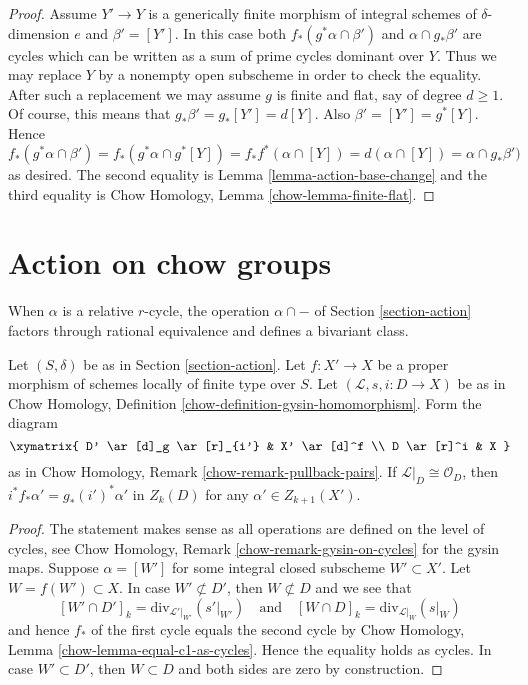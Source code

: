 \begin{proof}
\medskip\noindent
Assume $Y' \to Y$ is a generically finite morphism of integral schemes
of $\delta$-dimension $e$ and $\beta' = [Y']$. In this case both
$f_*(g^*\alpha \cap \beta')$ and $\alpha \cap g_*\beta'$ are cycles
which can be written as a sum of prime cycles dominant over $Y$.
Thus we may replace $Y$ by a nonempty open subscheme in order to
check the equality. After such a replacement we may assume $g$ is
finite and flat, say of degree $d \geq 1$. Of course, this means
that $g_*\beta' = g_*[Y'] = d[Y]$. Also $\beta' = [Y'] = g^*[Y]$. Hence
$$
f_*(g^*\alpha \cap \beta') =
f_*(g^*\alpha \cap g^*[Y]) =
f_*f^*(\alpha \cap [Y]) =
d (\alpha \cap [Y]) =
\alpha \cap g_*\beta')
$$
as desired. The second equality is Lemma \ref{lemma-action-base-change}
and the third equality is Chow Homology, Lemma \ref{chow-lemma-finite-flat}.
\end{proof}







\section{Action on chow groups}
\label{section-action-chow}

\noindent
When $\alpha$ is a relative $r$-cycle, the operation $\alpha \cap -$
of Section \ref{section-action} factors through rational equivalence
and defines a bivariant class.

\begin{lemma}
\label{lemma-closed-in-X-gysin}
Let $(S, \delta)$ be as in Section \ref{section-action}.
Let $f : X' \to X$ be a proper morphism of schemes
locally of finite type over $S$.
Let $(\mathcal{L}, s, i : D \to X)$ be as in
Chow Homology, Definition \ref{chow-definition-gysin-homomorphism}.
Form the diagram
$$
\xymatrix{
D' \ar[d]_g \ar[r]_{i'} & X' \ar[d]^f \\
D \ar[r]^i & X
}
$$
as in Chow Homology, Remark \ref{chow-remark-pullback-pairs}.
If $\mathcal{L}|_D \cong \mathcal{O}_D$, then
$i^*f_*\alpha' = g_*(i')^*\alpha'$ in $Z_k(D)$
for any $\alpha' \in Z_{k + 1}(X')$.
\end{lemma}

\begin{proof}
The statement makes sense as all operations are defined on the level
of cycles, see Chow Homology, Remark \ref{chow-remark-gysin-on-cycles}
for the gysin maps.
Suppose $\alpha = [W']$ for some integral closed subscheme
$W' \subset X'$. Let $W = f(W') \subset X$. In case $W' \not \subset D'$,
then $W \not \subset D$ and we see that
$$
[W' \cap D']_k = \text{div}_{\mathcal{L}'|_{W'}}({s'|_{W'}})
\quad\text{and}\quad
[W \cap D]_k = \text{div}_{\mathcal{L}|_W}(s|_W)
$$
and hence $f_*$ of the first cycle equals the second cycle by
Chow Homology, Lemma \ref{chow-lemma-equal-c1-as-cycles}. Hence the
equality holds as cycles. In case $W' \subset D'$, then
$W \subset D$ and both sides are zero by construction.
\end{proof}

